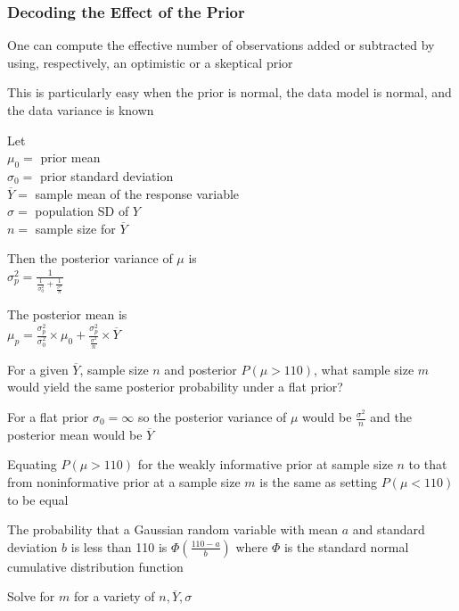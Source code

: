 \subsubsection{Decoding the Effect of the Prior}
\bi
\item One can compute the effective number of observations added or subtracted by using, respectively, an optimistic or a skeptical prior
\item This is particularly easy when the prior is normal, the data model is normal, and the data variance is known
\item Let\\
$\mu_{0} =$ prior mean\\
$\sigma_{0} =$ prior standard deviation\\
$\overline{Y} =$ sample mean of the response variable\\
$\sigma =$ population SD of $Y$\\
$n =$ sample size for $\overline{Y}$
\item Then the posterior variance of $\mu$ is\\
$\sigma^{2}_{p} = \frac{1}{\frac{1}{\sigma^{2}_{0}} + \frac{1}{\frac{\sigma^{2}}{n}}}$
\item The posterior mean is\\
$\mu_{p} = \frac{\sigma^{2}_{p}}{\sigma^{2}_{0}} \times \mu_{0} + \frac{\sigma^{2}_{p}}{\frac{\sigma^{2}}{n}} \times \overline{Y}$
\item For a given $\overline{Y}$, sample size $n$ and posterior $P(\mu > 110)$, what sample size $m$ would yield the same posterior probability under a flat prior?
\item For a flat prior $\sigma_{0} = \infty$ so the posterior variance of $\mu$ would be $\frac{\sigma^{2}}{n}$ and the posterior mean would be $\overline{Y}$
\item Equating $P(\mu > 110)$ for the weakly informative prior at sample size $n$ to that from noninformative prior at a sample size $m$ is the same as setting $P(\mu < 110)$ to be equal
\item The probability that a Gaussian random variable with mean $a$ and standard deviation $b$ is less than 110 is $\Phi(\frac{110-a}{b})$ where $\Phi$ is the standard normal cumulative distribution function
\item Solve for $m$ for a variety of $n, \overline{Y}, \sigma$

